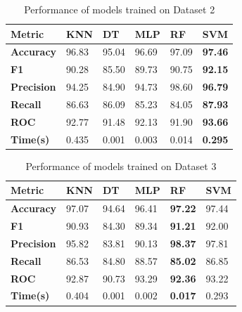 \begin{table}[H]
    \centering
    \caption{Performance of models trained on Dataset 2}\label{tab:performance_of_models_trained_on_dataset_2}
    \begin{tabular}{|p{5em}|C{3em}|C{3em}|C{3em}|C{3em}|C{3em}|}
        \hline
        \textbf{Metric} & \textbf{KNN} & \textbf{DT} & \textbf{MLP} & \textbf{RF} & \textbf{SVM} \\
        \hline
        \textbf{Accuracy} & 96.83 & 95.04 & 96.69 & 97.09 & \textbf{97.46} \\
        \textbf{F1} & 90.28 & 85.50 & 89.73 & 90.75 & \textbf{92.15} \\
        \textbf{Precision} & 94.25 & 84.90 & 94.73 & 98.60 & \textbf{96.79} \\
        \textbf{Recall} & 86.63 & 86.09 & 85.23 & 84.05 & \textbf{87.93} \\
        \textbf{ROC} & 92.77 & 91.48 & 92.13 & 91.90 & \textbf{93.66} \\
        \textbf{Time(s)} & 0.435 & 0.001 & 0.003 & 0.014 & \textbf{0.295} \\
        \hline
    \end{tabular}
\end{table}

\begin{table}[H]
    \centering
    \caption{Performance of models trained on Dataset 3}\label{tab:performance_of_models_trained_on_dataset_3}
    \begin{tabular}{|p{5em}|C{3em}|C{3em}|C{3em}|C{3em}|C{3em}|}
        \hline
        \textbf{Metric} & \textbf{KNN} & \textbf{DT} & \textbf{MLP} & \textbf{RF} & \textbf{SVM} \\
        \hline
        \textbf{Accuracy} & 97.07 & 94.64 & 96.41 & \textbf{97.22} & 97.44 \\
        \textbf{F1} & 90.93 & 84.30 & 89.34 & \textbf{91.21} & 92.00 \\
        \textbf{Precision} & 95.82 & 83.81 & 90.13 & \textbf{98.37} & 97.81 \\
        \textbf{Recall} & 86.53 & 84.80 & 88.57 & \textbf{85.02} & 86.85 \\
        \textbf{ROC} & 92.87 & 90.73 & 93.29 & \textbf{92.36} & 93.22 \\
        \textbf{Time(s)} & 0.404 & 0.001 & 0.002 & \textbf{0.017} & 0.293 \\
        \hline
    \end{tabular}
\end{table}

